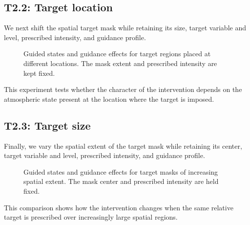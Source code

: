 

\subsection{T2.2: Target location}
\label{sec:target-location-analysis}

We next shift the spatial target mask while retaining its size, target
variable and level, prescribed intensity, and guidance profile.


\begin{figure}[H]
    \centering
    \caption{
        Guided states and guidance effects for target regions placed at
        different locations. The mask extent and prescribed intensity are kept
        fixed.
    }
    \label{fig:t2-target-location}
\end{figure}

This experiment tests whether the character of the intervention depends on
the atmospheric state present at the location where the target is imposed.



\subsection{T2.3: Target size}
\label{sec:target-size-analysis}

Finally, we vary the spatial extent of the target mask while retaining its
center, target variable and level, prescribed intensity, and guidance profile.


\begin{figure}[H]
    \centering
    \caption{
        Guided states and guidance effects for target masks of increasing
        spatial extent. The mask center and prescribed intensity are held
        fixed.
    }
    \label{fig:t2-target-size}
\end{figure}

This comparison shows how the intervention changes when the same relative
target is prescribed over increasingly large spatial regions.

